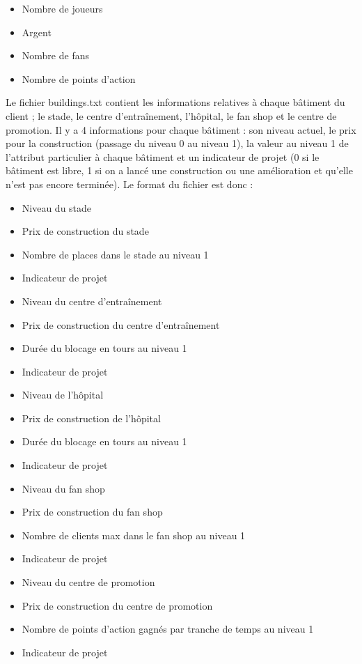 \documentclass[a4paper,titlepage]{scrreprt}
\begin{document}
       \begin{itemize}  
        \item Nombre de joueurs
        \item Argent
        \item Nombre de fans
        \item Nombre de points d’action
        \end{itemize} 

         
         Le fichier buildings.txt contient les informations relatives à chaque bâtiment du client ; le stade, le centre d’entraînement, l’hôpital, le fan shop et le centre de promotion. Il y a 4 informations pour chaque bâtiment : son niveau actuel, le prix pour la construction (passage du niveau 0 au niveau 1), la valeur au niveau 1 de l’attribut particulier à chaque bâtiment et un indicateur de projet (0 si le bâtiment est libre, 1 si on a lancé une construction ou une amélioration et qu’elle n’est pas encore terminée). Le format du fichier est donc :\\

          \begin{itemize}
            \item Niveau du stade
            \item Prix de construction du stade
            \item Nombre de places dans le stade au niveau 1
            \item Indicateur de projet
            \item Niveau du centre d’entraînement
            \item Prix de construction du centre d’entraînement
            \item Durée du blocage en tours au niveau 1
            \item Indicateur de projet
            \item Niveau de l’hôpital
            \item Prix de construction de l’hôpital
            \item Durée du blocage en tours au niveau 1
            \item Indicateur de projet
            \item Niveau du fan shop
            \item Prix de construction du fan shop
            \item Nombre de clients max dans le fan shop au niveau 1
            \item Indicateur de projet
            \item Niveau du centre de promotion
            \item Prix de construction du centre de promotion
            \item Nombre de points d’action gagnés par tranche de temps au niveau 1
            \item Indicateur de projet
        \end{itemize}
\end{document}
